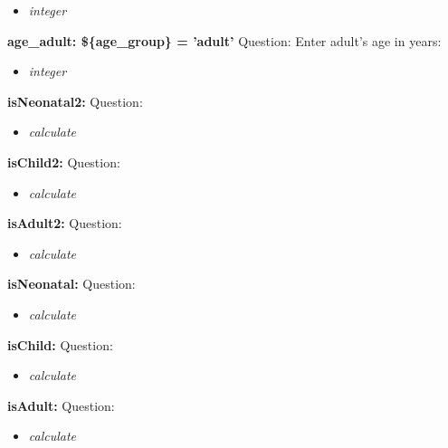 \documentclass{article}%
\begin{document}
%
\begin{itemize}%
\item%
\textit{integer\newline%
}%
\end{itemize}%
\textbf{age\_adult: \$\{age\_group\} = 'adult'\newline%
}%
Question: Enter adult's age in years:\newline%
%
\begin{itemize}%
\item%
\textit{integer\newline%
}%
\end{itemize}%
\textbf{isNeonatal2: \newline%
}%
Question: \newline%
%
\begin{itemize}%
\item%
\textit{calculate\newline%
}%
\end{itemize}%
\textbf{isChild2: \newline%
}%
Question: \newline%
%
\begin{itemize}%
\item%
\textit{calculate\newline%
}%
\end{itemize}%
\textbf{isAdult2: \newline%
}%
Question: \newline%
%
\begin{itemize}%
\item%
\textit{calculate\newline%
}%
\end{itemize}%
\textbf{isNeonatal: \newline%
}%
Question: \newline%
%
\begin{itemize}%
\item%
\textit{calculate\newline%
}%
\end{itemize}%
\textbf{isChild: \newline%
}%
Question: \newline%
%
\begin{itemize}%
\item%
\textit{calculate\newline%
}%
\end{itemize}%
\textbf{isAdult: \newline%
}%
Question: \newline%
%
\begin{itemize}%
\item%
\textit{calculate\newline%
}%
\end{itemize}%
\end{document}
